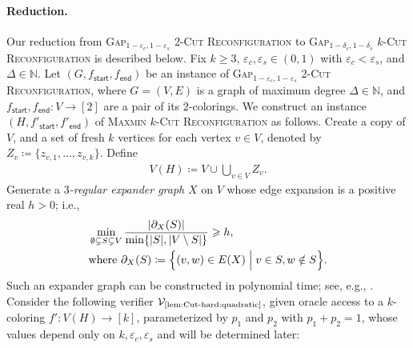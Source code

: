 \documentclass[11pt,fleqn]{article}
\renewcommand{\geq}{\geqslant}
\renewcommand{\epsilon}{\varepsilon}
\newcommand{\prb}[1]{\textsc{#1}\xspace}
\newcommand{\defeq}{\coloneq}
\newcommand{\sss}{\mathsf{start}}
\newcommand{\ttt}{\mathsf{end}}
\newcommand{\V}{\calV}
\newcommand{\f}{f}
\newcommand{\Vquad}{\V_{\text{\ref{lem:Cut-hard:quadratic}}}}
\newcommand{\kCutReconf}{\prb{$k$-Cut Reconfiguration}}
\newcommand{\MMkCutReconf}{\prb{Maxmin $k$-Cut Reconfiguration}}
\newcommand{\twoCutReconf}{\prb{2-Cut Reconfiguration}}
\newcommand{\calV}{\mathcal{V}}
\newcommand{\bbN}{\mathbb{N}}
\theoremstyle{definition}
\numberwithin{equation}{section}
\begin{document}
\paragraph{Reduction.}
Our reduction from
\prb{Gap$_{1-\epsilon_c, 1-\epsilon_s}$ \twoCutReconf} to
\prb{Gap$_{1-\delta_c, 1-\delta_s}$ \kCutReconf}
is described below.
Fix $k \geq 3$, $\epsilon_c,\epsilon_s \in (0,1)$ with $\epsilon_c < \epsilon_s$, and $\Delta \in \bbN$.
Let $(G,\f_\sss,\f_\ttt)$ be an instance of
\prb{Gap$_{1-\epsilon_c, 1-\epsilon_s}$ \twoCutReconf},
where $G=(V,E)$ is a graph of maximum degree $\Delta \in \bbN$, and
$\f_\sss,\f_\ttt \colon V \to [2]$ are a pair of its $2$-colorings.
We construct an instance $(H,\f'_\sss,\f'_\ttt)$
of \MMkCutReconf as follows.
Create a copy of $V$, and a set of fresh $k$ vertices for each vertex $v \in V$,
denoted by $Z_v \defeq \{z_{v,1}, \ldots, z_{v,k}\}$.
Define
\begin{align}
    V(H) \defeq V \cup \bigcup_{v \in V} Z_v.
\end{align}
Generate a \emph{$3$-regular expander graph} $X$ on $V$ whose edge expansion is a positive real $h > 0$; i.e.,
\begin{align}
\begin{aligned}
    & \min_{\emptyset \subsetneq S \subsetneq V}
        \frac{|\partial_X(S)|}{\min\{|S|, |V \setminus S|\}} \geq h, \\
    & \text{where }  \partial_X(S) \defeq \Bigl\{ (v,w) \in E(X) \Bigm| v \in S, w \notin S \Bigr\}.
\end{aligned}
\end{align}
Such an expander graph can be constructed in polynomial time; see, e.g., \cite{gabber1981explicit,reingold2002entropy,hoory2006expander}.
Consider the following verifier $\Vquad$,
given oracle access to a $k$-coloring $\f' \colon V(H) \to [k]$,
parameterized by $p_1$ and $p_2$ with $p_1+p_2=1$,
whose values depend only on $k,\epsilon_c,\epsilon_s$ and will be determined later:
\end{document}
